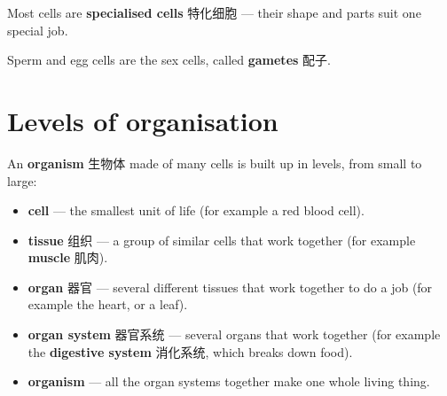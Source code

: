 \documentclass[11pt]{article}
\begin{document}
Most cells are \textbf{specialised cells} 特化细胞 — their shape and parts suit one special job.

\begin{center}
\end{center}

Sperm and egg cells are the sex cells, called \textbf{gametes} 配子.

\section*{Levels of organisation}

An \textbf{organism} 生物体 made of many cells is built up in levels, from small to large:

\begin{itemize}
\item \textbf{cell} — the smallest unit of life (for example a red blood cell).

\item \textbf{tissue} 组织 — a group of similar cells that work together (for example \textbf{muscle} 肌肉).

\item \textbf{organ} 器官 — several different tissues that work together to do a job (for example the heart, or a leaf).

\item \textbf{organ system} 器官系统 — several organs that work together (for example the \textbf{digestive system} 消化系统, which breaks down food).

\item \textbf{organism} — all the organ systems together make one whole living thing.

\end{itemize}
\end{document}

